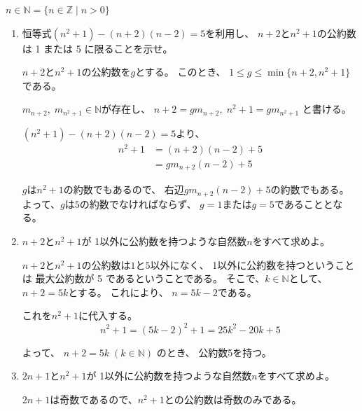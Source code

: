 \documentclass[12pt,b5paper]{ltjsarticle}
\begin{document}
\hrulefill

$n\in \mathbb{N} =\{ n\in\mathbb{Z} \mid n>0 \}$
\begin{enumerate}
 \item
      恒等式$(n^{2}+1) - (n+2)(n-2) = 5$を利用し、
      $n+2$と$n^{2}+1$の公約数は
      1 または 5 に限ることを示せ。

      \dotfill

      $n+2$と$n^{2}+1$の公約数を$g$とする。
      このとき、
      $1\leq g \leq \min\{n+2,n^{2}+1\}$
      である。

      $m_{n+2},\;m_{n^{2}+1} \in \mathbb{N}$が存在し、
      $n+2=gm_{n+2},\;n^{2}+1=gm_{n^{2}+1}$
      と書ける。

      $(n^{2}+1) - (n+2)(n-2) = 5$より、
      \begin{align}
       n^{2}+1
       &= (n+2)(n-2) + 5\\
       &= gm_{n+2}(n-2) + 5
      \end{align}
      
      $g$は$n^{2}+1$の約数でもあるので、
      右辺$gm_{n+2}(n-2) + 5$の約数でもある。
      よって、$g$は$5$の約数でなければならず、
      $g=1$または$g=5$であることとなる。


      \hrulefill

 \item
      $n+2$と$n^{2}+1$が
      1以外に公約数を持つような自然数$n$をすべて求めよ。

      \dotfill

      $n+2$と$n^{2}+1$の公約数は$1$と$5$以外になく、
      1以外に公約数を持つということは
      最大公約数が 5 であるということである。
      そこで、$k\in\mathbb{N}$として、
      $n+2=5k$とする。
      これにより、
      $n=5k-2$である。

      これを$n^{2}+1$に代入する。
      \begin{equation}
       n^{2}+1
        = (5k-2)^{2}+1
        = 25k^{2} -20k +5
      \end{equation}

      よって、
      $n+2=5k \; (k\in\mathbb{N})$
      のとき、
      公約数5を持つ。

      \hrulefill

 \item
      $2n+1$と$n^{2}+1$が
      1以外に公約数を持つような自然数$n$をすべて求めよ。

      \dotfill

      $2n+1$は奇数であるので、$n^{2}+1$との公約数は奇数のみである。


\end{enumerate}
\end{document}
